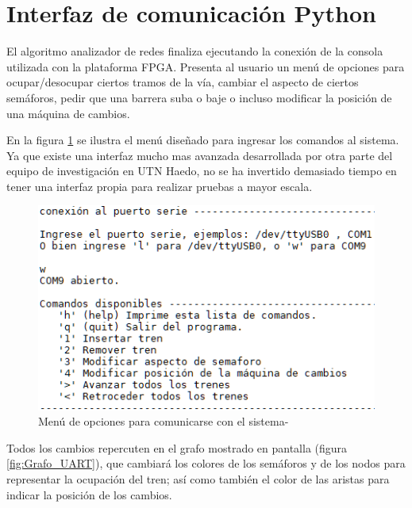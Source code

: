 \section{Interfaz de comunicación Python}

	El algoritmo analizador de redes finaliza ejecutando la conexión de la consola utilizada con la plataforma FPGA. Presenta al usuario un menú de opciones para ocupar/desocupar ciertos tramos de la vía, cambiar el aspecto de ciertos semáforos, pedir que una barrera suba o baje o incluso modificar la posición de una máquina de cambios.
	
	En la figura \ref{fig:Menu_UART} se ilustra el menú diseñado para ingresar los comandos al sistema. Ya que existe una interfaz mucho mas avanzada desarrollada por otra parte del equipo de investigación en UTN Haedo, no se ha invertido demasiado tiempo en tener una interfaz propia para realizar pruebas a mayor escala.
	
		\begin{figure}[h]
		\centering
		\includegraphics[scale=.76]{./Figures/Test/UART_2}
			\caption{Menú de opciones para comunicarse con el sistema-}
			\label{fig:Menu_UART}
		\end{figure}
	
	\vspace{5cm}
	
	Todos los cambios repercuten en el grafo mostrado en pantalla (figura \ref{fig:Grafo_UART}), que cambiará los colores de los semáforos y de los nodos para representar la ocupación del tren; así como también el color de las aristas para indicar la posición de los cambios.
	
